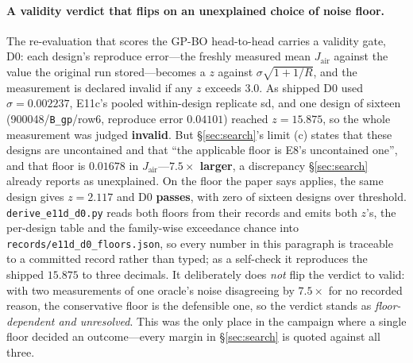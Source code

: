 \documentclass{article}
\newcommand{\Jair}{J_{\mathrm{air}}}
\begin{document}
\paragraph{A validity verdict that flips on an unexplained choice of noise floor.}
The re-evaluation that scores the GP-BO head-to-head carries a validity gate, D0: each
design's reproduce error---the freshly measured mean $\Jair$ against the value the original
run stored---becomes a $z$ against $\sigma\sqrt{1 + 1/R}$, and the measurement is declared
invalid if any $z$ exceeds $3.0$.  As shipped D0 used $\sigma = 0.002237$, E11c's pooled
within-design replicate sd, and one design of sixteen (900048/\texttt{B\_gp}/row6,
reproduce error $0.04101$) reached $z = 15.875$, so the whole measurement was judged
\textbf{invalid}.  But \S\ref{sec:search}'s limit (c) states that these designs are
uncontained and that ``the applicable floor is E8's uncontained one'', and that floor is
$0.01678$ in $\Jair$---\textbf{$7.5\times$ larger}, a discrepancy \S\ref{sec:search}
already reports as unexplained.  On the floor the paper says applies, the same design gives
$z = 2.117$ and D0 \textbf{passes}, with zero of sixteen designs over threshold.
\texttt{derive\_e11d\_d0.py} reads both floors from their records and emits both $z$'s, the
per-design table and the family-wise exceedance chance into
\texttt{records/e11d\_d0\_floors.json}, so every number in this paragraph is traceable to a
committed record rather than typed; as a self-check it reproduces the shipped $15.875$ to
three decimals.  It deliberately does \emph{not} flip the verdict to
valid: with two measurements of one oracle's noise disagreeing by $7.5\times$ for no
recorded reason, the conservative floor is the defensible one, so the verdict stands as
\emph{floor-dependent and unresolved}.  This was the only place in the campaign where a
single floor decided an outcome---every margin in \S\ref{sec:search} is quoted against all
three.
\end{document}
